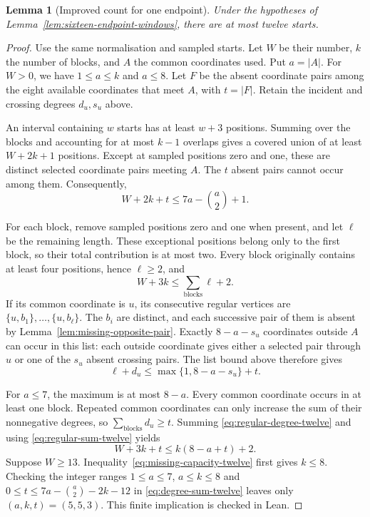 \documentclass[11pt,a4paper]{article}
\newtheorem{lemma}[theorem]{Lemma}
\theoremstyle{definition}
\theoremstyle{remark}
\begin{document}
\begin{lemma}[Improved count for one endpoint]\label{lem:twelve-endpoint-windows}
Under the hypotheses of Lemma~\ref{lem:sixteen-endpoint-windows}, there are
at most twelve starts.
\end{lemma}
\begin{proof}
Use the same normalisation and sampled starts. Let $W$ be their number,
$k$ the number of blocks, and $A$ the common coordinates used. Put $a=|A|$.
For $W>0$, we have $1\le a\le k$ and $a\le8$. Let $F$ be the absent
coordinate pairs among the eight available coordinates that meet $A$, with
$t=|F|$. Retain the incident and crossing degrees $d_u,s_u$ above.

An interval containing $w$ starts has at least $w+3$ positions. Summing
over the blocks and accounting for at most $k-1$ overlaps gives a covered
union of at least $W+2k+1$ positions. Except at sampled positions zero and
one, these are distinct selected coordinate pairs meeting $A$. The $t$
absent pairs cannot occur among them. Consequently,
\begin{equation}\label{eq:missing-capacity-twelve}
W+2k+t\le7a-\binom a2+1.
\end{equation}

For each block, remove sampled positions zero and one when present, and
let $\ell$ be the remaining length. These exceptional positions belong
only to the first block, so their total contribution is at most two.
Every block originally contains at least four positions, hence $\ell\ge2$,
and
\begin{equation}\label{eq:regular-sum-twelve}
W+3k\le\sum_{\text{blocks}}\ell+2.
\end{equation}
If its common coordinate is $u$, its consecutive regular vertices are
$\{u,b_1\},\ldots,\{u,b_\ell\}$. The $b_i$ are distinct, and each
successive pair of them is absent by Lemma~\ref{lem:missing-opposite-pair}.
Exactly $8-a-s_u$ coordinates outside $A$ can occur in this list: each
outside coordinate gives either a selected pair through $u$ or one of
the $s_u$ absent crossing pairs. The list bound above therefore gives
\begin{equation}\label{eq:regular-degree-twelve}
\ell+d_u\le\max\{1,8-a-s_u\}+t.
\end{equation}

For $a\le7$, the maximum is at most $8-a$. Every common coordinate occurs
in at least one block. Repeated common coordinates can only increase the
sum of their nonnegative degrees, so $\sum_{\text{blocks}}d_u\ge t$.
Summing \eqref{eq:regular-degree-twelve} and using
\eqref{eq:regular-sum-twelve} yields
\begin{equation}\label{eq:degree-sum-twelve}
W+3k+t\le k(8-a+t)+2.
\end{equation}
Suppose $W\ge13$. Inequality~\eqref{eq:missing-capacity-twelve} first gives
$k\le8$. Checking the integer ranges $1\le a\le7$, $a\le k\le8$ and
$0\le t\le7a-\binom a2-2k-12$ in
\eqref{eq:degree-sum-twelve} leaves only $(a,k,t)=(5,5,3)$.
This finite implication is checked in Lean.


\end{proof}
\end{document}
